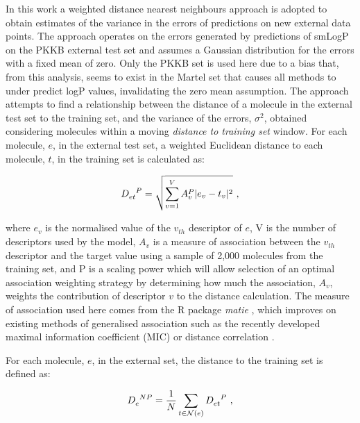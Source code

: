 \documentclass[10pt]{bmc_article}
\newenvironment{bmcformat}{\begin{raggedright}\baselineskip20pt\sloppy\setboolean{publ}{false}}{\end{raggedright}\baselineskip20pt\sloppy}
\begin{document}
\begin{bmcformat}
  








In this work a weighted distance nearest neighbours approach is adopted to obtain estimates of the variance in the errors of predictions on new external data points. The approach operates on the errors generated by predictions of smLogP on the PKKB external test set and assumes a Gaussian distribution for the errors with a fixed mean of zero. Only the PKKB set is used here due to a bias that, from this analysis, seems to exist in the Martel set that causes all methods to under predict logP values, invalidating the zero mean assumption. The approach attempts to find a relationship between the distance of a molecule in the external test set to the training set, and the variance of the errors, $\sigma^2$, obtained considering molecules within a moving \textit{distance to training set} window. For each molecule, $e$, in the external test set, a weighted Euclidean distance to each molecule, $t$, in the training set is calculated as: 

\begin{equation}
\tensor{D}{_e_t^P} = \sqrt{ \sum_{v=1}^{V}{A_v^P |e_v -  t_v|^2}}\ ,
\end{equation}


where $e_v$ is the normalised value of the $v_{th}$ descriptor of $e$, V is the number of descriptors used by the model, $A_v$ is a measure of association between the $v_{th}$ descriptor and the target value using a sample of 2,000 molecules from the training set, and P is a scaling power which will allow selection of an optimal association weighting strategy by determining how much the association, $A_v$, weights the contribution of descriptor $v$ to the distance calculation. The measure of association used here comes from the R package \textit{matie} \cite{murrell_discovering_2013}, which improves on existing methods of generalised association such as the recently developed maximal information coefficient (MIC) \cite{reshef_detecting_2011} or distance correlation \cite{szekely_measuring_2007}.

For each molecule, $e$, in the external set, the distance to the training set is defined as:

\begin{equation}
\tensor{D}{_e^N^P} = \frac{1}{N} \sum_{t \in \mathcal{N}(e)}{\tensor{D}{_e_t^P}}\ ,
\end{equation}


\end{bmcformat}
\end{document}
